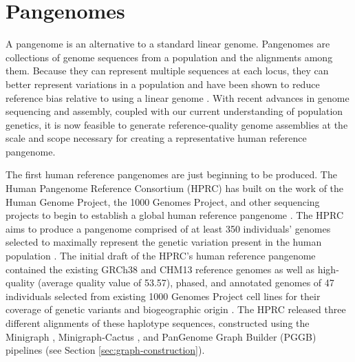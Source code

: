 \documentclass[11pt]{ucscthesis}
\begin{document}

\section{Pangenomes}
\label{sec:background:pangenomes}

A pangenome is an alternative to a standard linear genome.
Pangenomes are collections of genome sequences from a population and the alignments among them.
Because they can represent multiple sequences at each locus, they can better represent variations in a population and have been shown to reduce reference bias relative to using a linear genome \cite{sherman_pan-genomics_2020,noauthor_computational_2016,hprc_pangenome_2023}.
With recent advances in genome sequencing and assembly, coupled with our current understanding of population genetics, it is now feasible to generate reference-quality genome assemblies at the scale and scope necessary for creating a representative human reference pangenome.

The first human reference pangenomes are just beginning to be produced.
The Human Pangenome Reference Consortium (HPRC) has built on the work of the Human Genome Project, the 1000 Genomes Project, and other sequencing projects to begin to establish a global human reference pangenome \cite{hprc_2022}.
The HPRC aims to produce a pangenome comprised of at least 350 individuals' genomes selected to maximally represent the genetic variation present in the human population \cite{hprc_2022}.
The initial draft of the HPRC's human reference pangenome contained the existing GRCh38 and CHM13 reference genomes as well as high-quality (average quality value of 53.57), phased, and annotated genomes of 47 individuals selected from existing 1000 Genomes Project cell lines for their coverage of genetic variants and biogeographic origin \cite{hprc_pangenome_2023}.
The HPRC released three different alignments of these haplotype sequences, constructed using the Minigraph \cite{li_minigraph_2020}, Minigraph-Cactus \cite{minigraph_cactus_2024}, and PanGenome Graph Builder (PGGB) \cite{pggb_2024} pipelines (see Section \ref{sec:graph-construction}). 
\end{document}
